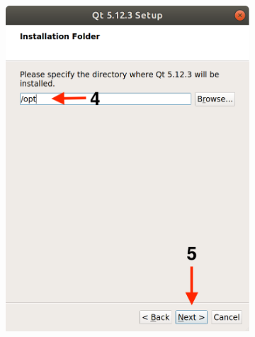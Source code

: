 \begin{figure}[H]
\begin{subfigure}{0.32\linewidth}
        \includegraphics[width=1\textwidth]{images/Qt4.png}
    \end{subfigure}
    \begin{subfigure}{0.32\linewidth}

\end{subfigure}
\end{figure}
